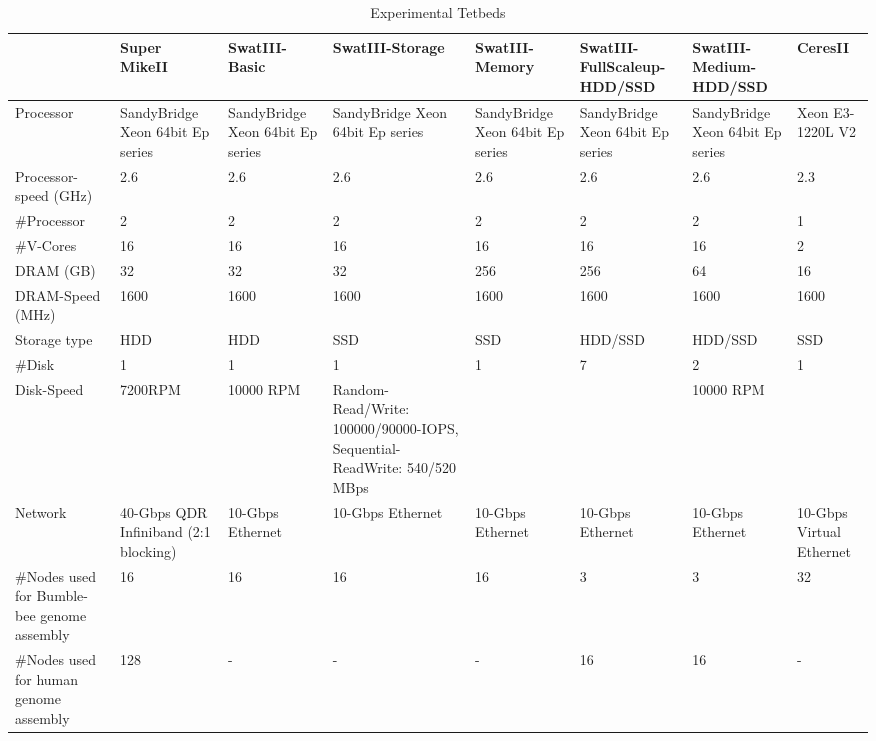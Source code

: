 \documentclass[conference]{IEEEtran}
\begin{document}
\begin{table}
\begin{center}
    \begin{tabular}{ |p{1.3cm} | p{1.3cm} | p{1.3cm} | p{1.3cm} | p{1.3cm} | p{1.3cm} | p{1.3cm}| p{1.3cm}|} \hline
    & Super MikeII & SwatIII-Basic & SwatIII-Storage & SwatIII-Memory & SwatIII-FullScaleup-HDD/SSD & SwatIII-Medium-HDD/SSD & CeresII \\ \hline
    Processor & SandyBridge Xeon 64bit Ep series & SandyBridge Xeon 64bit Ep series & SandyBridge Xeon 64bit Ep series & SandyBridge Xeon 64bit Ep series & SandyBridge Xeon 64bit Ep series & SandyBridge Xeon 64bit Ep series &  Xeon E3-1220L V2 \\ \hline
    Processor-speed (GHz) & 2.6 & 2.6 & 2.6 & 2.6 & 2.6 & 2.6 & 2.3 \\ \hline
    \#Processor & 2 & 2 & 2 & 2 & 2 & 2 & 1 \\ \hline
    \#V-Cores & 16 & 16 & 16 & 16 & 16 & 16 & 2 \\ \hline \hline
    DRAM (GB) & 32 & 32 & 32 & 256 & 256 & 64 & 16  \\ \hline
    DRAM-Speed (MHz) & 1600 & 1600  & 1600  & 1600  & 1600  & 1600 & 1600 \\ \hline \hline
	Storage type & HDD & HDD & SSD & SSD & HDD/SSD & HDD/SSD & SSD \\ \hline    
    \#Disk & 1 & 1 & 1 & 1 & 7 & 2 & 1 \\ \hline
    Disk-Speed & 7200RPM & 10000 RPM & Random-Read/Write: 100000/90000-IOPS, Sequential-Read\/Write: 540/520 MBps &   &   & 10000 RPM &   \\ \hline \hline
    Network & 40-Gbps QDR Infiniband (2:1 blocking) & 10-Gbps Ethernet & 10-Gbps Ethernet & 10-Gbps Ethernet & 10-Gbps Ethernet & 10-Gbps Ethernet & 10-Gbps Virtual Ethernet\\ \hline \hline
    \#Nodes used for Bumble-bee genome assembly & 16 & 16 & 16 & 16 & 3 & 3 & 32 \\ \hline
    \#Nodes used for human genome assembly & 128 & - & - & - & 16 & 16 & - \\ \hline
    \end{tabular}
    \caption{Experimental Tetbeds}
	\label{table:Experimentaltestbeds}
\end{center}
\end{table}
\end{document}
